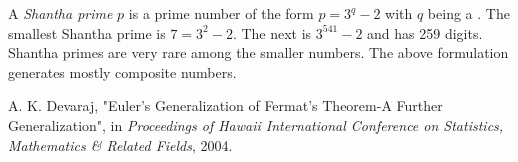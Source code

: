 \documentclass[12pt]{article}
\begin{document}
A {\em Shantha prime} $p$ is a prime number of the form $p = 3^q - 2$ with $q$ being a . The smallest Shantha prime is $7 = 3^2 - 2$. The next is $3^{541} - 2$ and has 259 digits. Shantha primes are very rare among the smaller numbers. The above formulation generates mostly composite numbers.

\begin{thebibliography}{1}
 A. K. Devaraj, "Euler's Generalization of Fermat's Theorem-A Further Generalization", in {\it Proceedings of Hawaii International Conference on Statistics, Mathematics \& Related Fields}, 2004.
\end{thebibliography}


\end{document}

